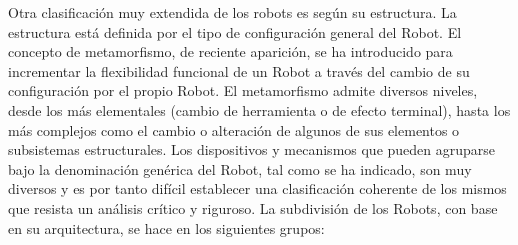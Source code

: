 Otra clasificación muy extendida de los robots es según su estructura. La estructura está definida por el tipo de configuración general del Robot. El concepto de metamorfismo, de reciente aparición, se ha introducido para incrementar la flexibilidad funcional de un Robot a través del cambio de su configuración por el propio Robot. El metamorfismo admite diversos niveles, desde los más elementales (cambio de herramienta o de efecto terminal), hasta los más complejos como el cambio o alteración de algunos de sus elementos o subsistemas estructurales. Los dispositivos y mecanismos que pueden agruparse bajo la denominación genérica del Robot, tal como se ha indicado, son muy diversos y es por tanto difícil establecer una clasificación coherente de los mismos que resista un análisis crítico y riguroso. La subdivisión de los Robots, con base en su arquitectura, se hace en los siguientes grupos: 
